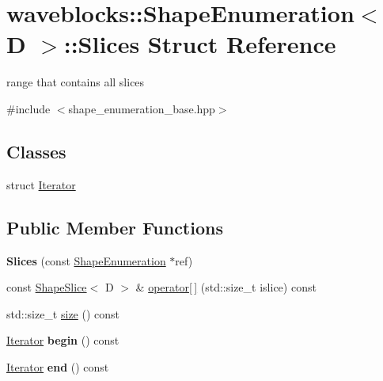 \hypertarget{structwaveblocks_1_1_shape_enumeration_1_1_slices}{}\section{waveblocks\+:\+:Shape\+Enumeration$<$ D $>$\+:\+:Slices Struct Reference}
\label{structwaveblocks_1_1_shape_enumeration_1_1_slices}


range that contains all slices  




{\ttfamily \#include $<$shape\+\_\+enumeration\+\_\+base.\+hpp$>$}

\subsection*{Classes}
\begin{DoxyCompactItemize}
\item 
struct \hyperlink{structwaveblocks_1_1_shape_enumeration_1_1_slices_1_1_iterator}{Iterator}
\end{DoxyCompactItemize}
\subsection*{Public Member Functions}
\begin{DoxyCompactItemize}
\item 
\hypertarget{structwaveblocks_1_1_shape_enumeration_1_1_slices_aebf76755af8452f5e9968e1fc37b3899}{}{\bfseries Slices} (const \hyperlink{classwaveblocks_1_1_shape_enumeration}{Shape\+Enumeration} $\ast$ref)\label{structwaveblocks_1_1_shape_enumeration_1_1_slices_aebf76755af8452f5e9968e1fc37b3899}

\item 
const \hyperlink{classwaveblocks_1_1_shape_slice}{Shape\+Slice}$<$ D $>$ \& \hyperlink{structwaveblocks_1_1_shape_enumeration_1_1_slices_a3e2fbec01080a58491bf7489106beaa9}{operator\mbox{[}$\,$\mbox{]}} (std\+::size\+\_\+t islice) const 
\item 
std\+::size\+\_\+t \hyperlink{structwaveblocks_1_1_shape_enumeration_1_1_slices_a9d9a13749b1f70cea263c47ae2edf404}{size} () const 
\item 
\hypertarget{structwaveblocks_1_1_shape_enumeration_1_1_slices_adcb2f1dbc385e3406811a2a2674b4597}{}\hyperlink{structwaveblocks_1_1_shape_enumeration_1_1_slices_1_1_iterator}{Iterator} {\bfseries begin} () const \label{structwaveblocks_1_1_shape_enumeration_1_1_slices_adcb2f1dbc385e3406811a2a2674b4597}

\item 
\hypertarget{structwaveblocks_1_1_shape_enumeration_1_1_slices_aaff87fb1d9022fe0c8fd478d3ff0ac28}{}\hyperlink{structwaveblocks_1_1_shape_enumeration_1_1_slices_1_1_iterator}{Iterator} {\bfseries end} () const \label{structwaveblocks_1_1_shape_enumeration_1_1_slices_aaff87fb1d9022fe0c8fd478d3ff0ac28}

\end{DoxyCompactItemize}


